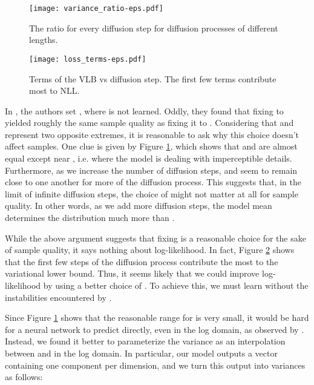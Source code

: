 \documentclass{article}
\begin{document}
\begin{figure}[ht]
\begin{center}
\centerline{\texttt{[image: variance\_ratio-eps.pdf]}}
\caption{\label{fig:sigmaratio} The ratio  for every diffusion step for diffusion processes of different lengths.}
\end{center}
\vskip -0.4in
\end{figure}

\begin{figure}[ht]
\vskip 0.2in
\begin{center}
\centerline{\texttt{[image: loss\_terms-eps.pdf]}}
\caption{\label{fig:lossterms} Terms of the VLB vs diffusion step. The first few terms contribute most to NLL.}\end{center}
\vskip -0.4in
\end{figure}



In \citet{ddpm}, the authors set , where  is not learned. Oddly, they found that fixing  to  yielded roughly the same sample quality as fixing it to . Considering that  and  represent two opposite extremes, it is reasonable to ask why this choice doesn't affect samples. One clue is given by Figure \ref{fig:sigmaratio}, which shows that  and  are almost equal except near , i.e. where the model is dealing with imperceptible details. Furthermore, as we increase the number of diffusion steps,  and  seem to remain close to one another for more of the diffusion process. This suggests that, in the limit of infinite diffusion steps, the choice of  might not matter at all for sample quality. In other words, as we add more diffusion steps, the model mean  determines the distribution much more than .

While the above argument suggests that fixing  is a reasonable choice for the sake of sample quality, it says nothing about log-likelihood. In fact, Figure \ref{fig:lossterms} shows that the first few steps of the diffusion process contribute the most to the variational lower bound. Thus, it seems likely that we could improve log-likelihood by using a better choice of . To achieve this, we must learn  without the instabilities encountered by \citet{ddpm}.

Since Figure \ref{fig:sigmaratio} shows that the reasonable range for  is very small, it would be hard for a neural network to predict  directly, even in the log domain, as observed by \citet{ddpm}. Instead, we found it better to parameterize the variance as an interpolation between  and  in the log domain. In particular, our model outputs a vector  containing one component per dimension, and we turn this output into variances as follows:
\end{document}
